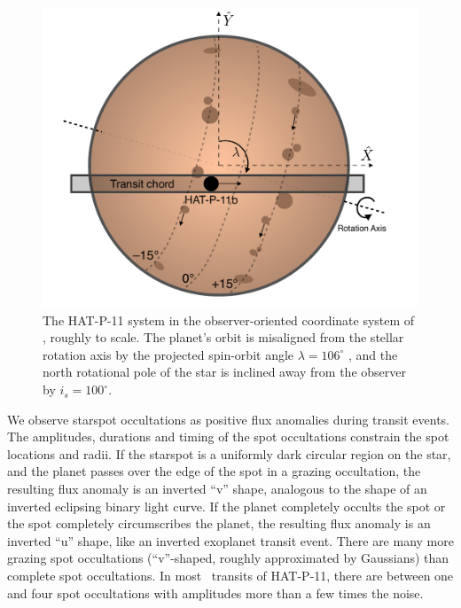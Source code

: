 \begin{figure}
\centering
\includegraphics[scale=0.45]{stsp_hat_p_11/schematic.pdf}
\caption{The HAT-P-11 system in the observer-oriented coordinate system of \citet{Fabrycky2009}, roughly to scale. The planet's orbit is misaligned from the stellar rotation axis by the projected spin-orbit angle $\lambda = 106^\circ$ \citep{Sanchis-Ojeda2011}, and the north rotational pole of the star is inclined away from the observer by $i_s = 100^\circ$.}
\label{fig:schematic}
\end{figure}

We observe starspot occultations as positive flux anomalies during transit events. The amplitudes, durations and timing of the spot occultations constrain the spot locations and radii. If the starspot is a uniformly dark circular region on the star, and the planet passes over the edge of the spot in a grazing occultation, the resulting flux anomaly is an inverted ``v'' shape, analogous to the shape of an inverted eclipsing binary light curve. If the planet completely occults the spot or the spot completely circumscribes the planet, the resulting flux anomaly is an inverted ``u'' shape, like an inverted exoplanet transit event. There are many more grazing spot occultations (``v''-shaped, roughly approximated by Gaussians) than complete spot occultations. In most \kepler\ transits of HAT-P-11, there are between one and four spot occultations with amplitudes more than a few times the noise.


